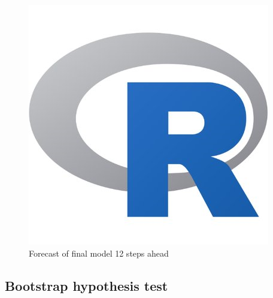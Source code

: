\documentclass[article]{jss}
\begin{document}
%

\begin{figure}[H]
  \centering
  \caption{Forecast of final model 12 steps ahead}
  \label{fig:forecast}
  \includegraphics[scale = 1, keepaspectratio=true]{Figures/forecast.png}
\end{figure}

\subsection{Bootstrap hypothesis test}
\label{sec:bootstr-hypoth-test}
\end{document}
